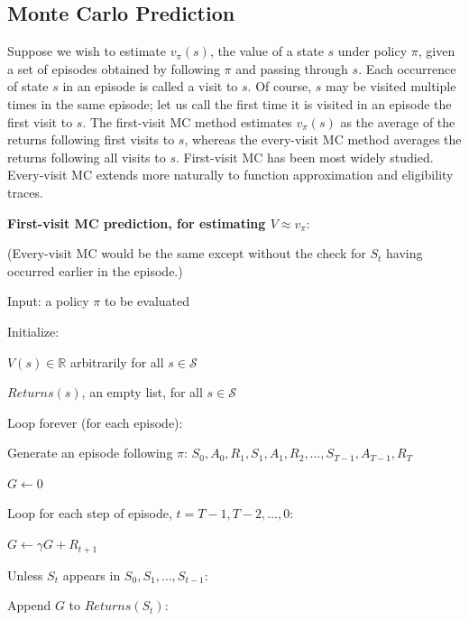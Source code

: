 \documentclass{article}
\begin{document}
\subsection{Monte Carlo Prediction}

Suppose we wish to estimate \(v_{\pi}(s)\), the value of a state \(s\) under policy \(\pi\), 
given a set of episodes obtained by following \(\pi\) and passing through \(s\). Each occurrence of state \(s\) in an episode is called a visit to \(s\). 
Of course, \(s\) may be visited multiple times in the same episode; let us call the first time it is visited in an episode the first visit to \(s\). 
The first-visit MC method estimates \(v_{\pi}(s)\) as the average of the returns following first visits to \(s\), 
whereas the every-visit MC method averages the returns following all visits to \(s\). 
First-visit MC has been most widely studied. Every-visit MC extends more naturally to function approximation and eligibility traces.

\textbf{First-visit MC prediction, for estimating \(V \approx v_{\pi}\)}:

(Every-visit MC would be the same except without the check for \(S_t\) having occurred earlier in the episode.)

Input: a policy \(\pi\) to be evaluated

Initialize:

\hspace{.5cm} \(V(s) \in \mathbb{R}\) arbitrarily for all \(s \in \mathcal{S}\)

\hspace{.5cm} \(Returns(s)\), an empty list, for all \(s \in \mathcal{S}\)

Loop forever (for each episode):

\hspace{.5cm} Generate an episode following \(\pi\): \(S_0, A_0, R_1, S_1, A_1, R_2, \dots, S_{T - 1}, A_{T - 1}, R_{T}\)

\hspace{.5cm} \(G \leftarrow 0\)

\hspace{.5cm} Loop for each step of episode, \(t = T - 1, T - 2, \dots, 0\):

\hspace{1cm} \(G \leftarrow \gamma G + R_{t + 1}\)

\hspace{1cm} Unless \(S_t\) appears in \(S_0, S_1, \dots, S_{t - 1}\):

\hspace{1.5cm} Append \(G\) to \(Returns(S_t)\):
\end{document}
